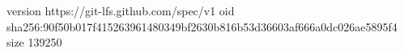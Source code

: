 version https://git-lfs.github.com/spec/v1
oid sha256:90f50b017f415263961480349bf2630b816b53d36603af666a0dc026ae5895f4
size 139250
